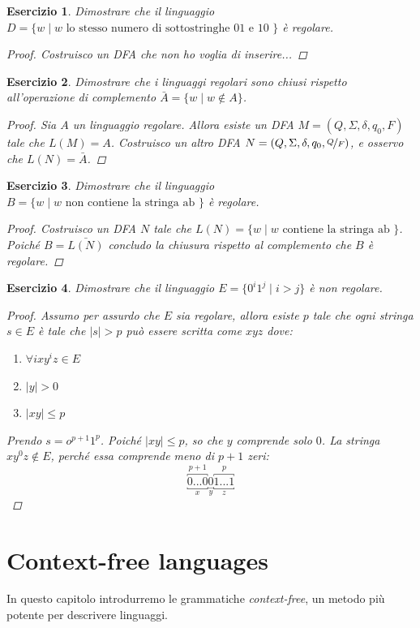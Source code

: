 \documentclass[italian]{article}
\newcommand{\taleche}{\;|\;}
\newtheorem*{exercize*}{Esercizio}
\begin{document}
\begin{exercize*}
	Dimostrare che il linguaggio $D=\{ w \taleche w \text{ lo stesso numero di sottostringhe 01 e 10 }\}$ è regolare.
	\begin{proof}
		Costruisco un DFA che non ho voglia di inserire...
	\end{proof}
\end{exercize*}
\begin{exercize*}
	Dimostrare che i linguaggi regolari sono chiusi rispetto all'operazione di complemento $\bar{A} = \{ w \taleche w \notin A \}$.
	\begin{proof}
			Sia $A$ un linguaggio regolare. Allora esiste un DFA $M = (Q,\Sigma,\delta,q_0,F)$ tale che $L(M) = A$. Costruisco un altro DFA $N = (Q,\Sigma,\delta,q_0,\nicefrac{Q}{F})$, e osservo che $L(N) = \bar{A}$.
	\end{proof}
\end{exercize*}
\begin{exercize*}
	Dimostrare che il linguaggio $B=\{ w \taleche w \text{ non contiene la stringa ab }\}$ è regolare.
	\begin{proof}
		Costruisco un DFA $N$ tale che $L(N) = \{ w \taleche w \text{ contiene la stringa ab }\}$. Poiché $B = \bar{L(N)}$ concludo la chiusura rispetto al complemento che $B$ è regolare.
	\end{proof}
\end{exercize*}
\begin{exercize*}
	Dimostrare che il linguaggio $E=\{ 0^i1^j \taleche i > j \}$ è non regolare.
	\begin{proof}
		Assumo per assurdo che $E$ sia regolare, allora esiste $p$ tale che ogni stringa $s \in E$ è tale che $|s| > p$ può essere scritta come $xyz$ dove:
		\begin{enumerate}
			\item $\forall i xy^iz \in E$
			\item $|y| > 0$
			\item $|xy| \leq p$
		\end{enumerate} 
	Prendo $s = o^{p+1}1^p$. Poiché $|xy| \leq p$, so che $y$ comprende solo $0$. La stringa $xy^0z \notin E$, perché essa comprende meno di $p+1$ zeri:
	\[
	\overbracket{\underbracket{0...0}_{x}}^{p+1}\underbracket{0}_{y}\overbracket{\underbracket{1...1}_{z}}^{p}
	\]
	\end{proof}
\end{exercize*}
\section{Context-free languages}
In questo capitolo introdurremo le grammatiche \textit{context-free}, un metodo più potente per descrivere linguaggi.
\end{document}
